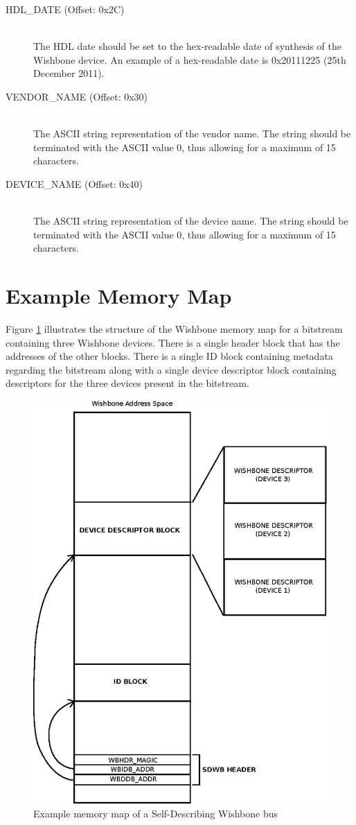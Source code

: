 \documentclass{article}
\begin{document}
\begin{description}
\item[HDL\_DATE (Offset: 0x2C)] \hfill \\
The HDL date should be set to the hex-readable date of synthesis of
the Wishbone device. An example of a hex-readable date is 0x20111225 (25th
December 2011).

\item[VENDOR\_NAME (Offset: 0x30)] \hfill \\
The ASCII string representation of the vendor name. The string should be
terminated with the ASCII value 0, thus allowing for a maximum of 15
characters.

\item[DEVICE\_NAME (Offset: 0x40)] \hfill \\
The ASCII string representation of the device name. The string should be
terminated with the ASCII value 0, thus allowing for a maximum of 15
characters.
\end{description}

\section{Example Memory Map}

Figure \ref{fig:wbmap} illustrates the
structure of the Wishbone memory map for a bitstream containing three Wishbone
devices. There is a single header block that has the addresses of the other
blocks. There is a single ID block containing metadata regarding the bitstream
along with a single device descriptor block containing descriptors for the three
devices present in the bitstream.

\begin{figure}[!ht]
	\centering
	\includegraphics{wbmap.eps}
	\caption{Example memory map of a Self-Describing Wishbone bus}
	\label{fig:wbmap}
\end{figure}
\end{document}
